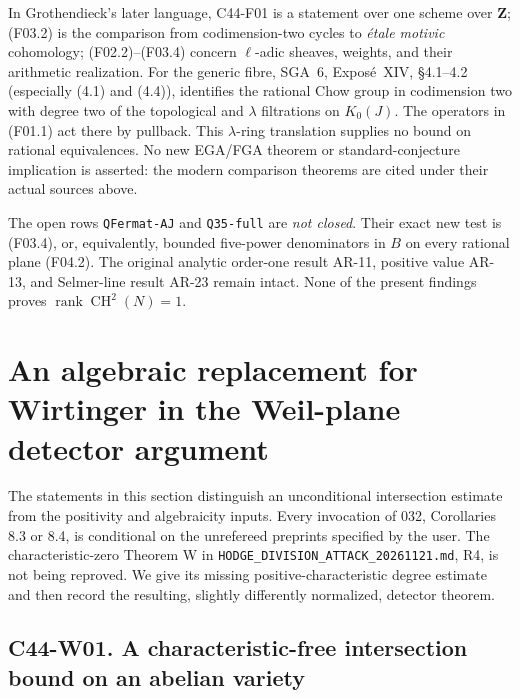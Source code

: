 \documentclass[11pt]{article}
\theoremstyle{remark}\newtheorem{remark}[theorem]{Remark}
\begin{document}
In Grothendieck's later language, C44-F01 is a statement over
one scheme over $\mathbf Z$; (F03.2) is the comparison from
codimension-two cycles to \emph{\'etale motivic} cohomology;
(F02.2)--(F03.4) concern $\ell$-adic sheaves, weights, and their
arithmetic realization.  For the generic fibre, SGA~6,
Expos\'e~XIV, \S4.1--4.2 (especially (4.1) and (4.4)),
identifies the rational Chow group in codimension two with
degree two of the topological and $\lambda$ filtrations on
$K_0(J)$.  The operators in (F01.1) act there by pullback.
This $\lambda$-ring translation supplies no bound on rational
equivalences.  No new EGA/FGA theorem or standard-conjecture
implication is asserted: the modern comparison theorems are
cited under their actual sources above.

The open rows \texttt{QFermat-AJ} and \texttt{Q35-full} are
\emph{not closed}.  Their exact new test is (F03.4), or,
equivalently, bounded five-power denominators in $B$ on every
rational plane (F04.2).  The original analytic order-one result
AR-11, positive value AR-13, and Selmer-line result AR-23
remain intact.  None of the present findings proves
$\operatorname{rank}\operatorname{CH}^2(N)=1$.



\section{An algebraic replacement for Wirtinger in the Weil-plane detector argument}

The statements in this section distinguish an unconditional intersection
estimate from the positivity and algebraicity inputs.  Every invocation of
032, Corollaries 8.3 or 8.4, is conditional on the unrefereed preprints
specified by the user.  The characteristic-zero Theorem W in
\texttt{HODGE\_DIVISION\_ATTACK\_20261121.md}, R4, is not being reproved.
We give its missing positive-characteristic degree estimate and then record
the resulting, slightly differently normalized, detector theorem.

\subsection*{C44-W01. A characteristic-free intersection bound on an abelian variety}
\end{document}
